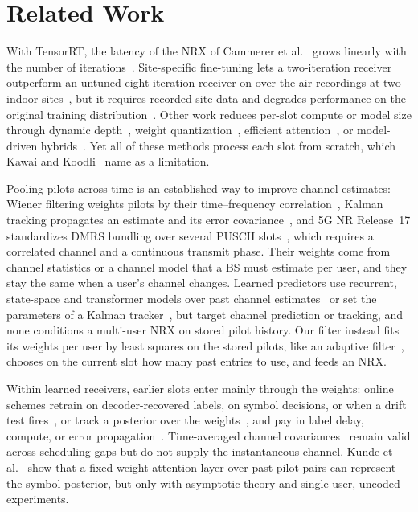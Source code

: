 \section{Related Work}
With TensorRT, the latency of the NRX of Cammerer et al.~\cite{cammerer2023neural} grows linearly with the number of iterations~\cite{wiesmayr2025realtime}. Site-specific fine-tuning lets a two-iteration receiver outperform an untuned eight-iteration receiver on over-the-air recordings at two indoor sites~\cite{baytekin2026site}, but it requires recorded site data and degrades performance on the original training distribution~\cite{wiesmayr2025realtime}. Other work reduces per-slot compute or model size through dynamic depth~\cite{vanbolderik2024layerskip}, weight quantization~\cite{yellapragada2026qat}, efficient attention~\cite{yellapragada2026axial,kawai2025unified}, or model-driven hybrids~\cite{honkala2026eqdeeprx}. Yet all of these methods process each slot from scratch, which Kawai and Koodli~\cite{kawai2025unified} name as a limitation.

Pooling pilots across time is an established way to improve channel estimates: Wiener filtering weights pilots by their time--frequency correlation~\cite{hoeher1997wiener}, Kalman tracking propagates an estimate and its error covariance~\cite{komninakis2002kalman}, and 5G NR Release~17 standardizes DMRS bundling over several PUSCH slots~\cite{3gpp38830,3gpp38214}, which requires a correlated channel and a continuous transmit phase. Their weights come from channel statistics or a channel model that a BS must estimate per user, and they stay the same when a user's channel changes. Learned predictors use recurrent, state-space and transformer models over past channel estimates~\cite{mattu2022deep,luo2025cpmamba,lagona2026transformer} or set the parameters of a Kalman tracker~\cite{pratik2021hkf}, but target channel prediction or tracking, and none conditions a multi-user NRX on stored pilot history. Our filter instead fits its weights per user by least squares on the stored pilots, like an adaptive filter~\cite{haykin2002adaptive}, chooses on the current slot how many past entries to use, and feeds an NRX.

Within learned receivers, earlier slots enter mainly through the weights: online schemes retrain on decoder-recovered labels, on symbol decisions, or when a drift test fires~\cite{fischer2022adaptive,finish2022symbol,uzlaner2025asynchronous}, or track a posterior over the weights~\cite{gusakov2026online}, and pay in label delay, compute, or error propagation~\cite{fischer2022adaptive,gusakov2026online}. Time-averaged channel covariances~\cite{wiesmayr2026impact} remain valid across scheduling gaps but do not supply the instantaneous channel. Kunde et al.~\cite{kunde2025transformers} show that a fixed-weight attention layer over past pilot pairs can represent the symbol posterior, but only with asymptotic theory and single-user, uncoded experiments.


